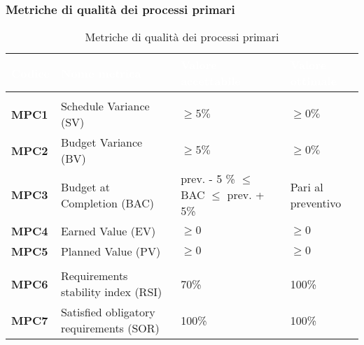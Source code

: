 \subsubsection{Metriche di qualità dei processi primari}
{
\renewcommand{\arraystretch}{1.5}
\centering
\begin{longtable}{C{2.5cm} C{4cm} C{6cm} C{2.5cm}}
\textcolor{white}{\textbf{Codice}}&
\textcolor{white}{\textbf{Nome metrica}}&
\textcolor{white}{\textbf{Valore accettabile}}&
\textcolor{white}{\textbf{Valore ottimale}}\\	
\hline
{}
 \\
\endhead

\endfoot
{}\caption{Metriche di qualità dei processi primari}
\endlastfoot

\textbf{MPC1} & Schedule Variance (SV) & $\geq 5\%$ & $\geq 0\%$ \\
\textbf{MPC2} & Budget Variance (BV) & $\geq 5\%$ & $\geq 0\%$ \\
\textbf{MPC3} & Budget at Completion (BAC) & prev. - 5 \% $ \leq $ BAC $ \leq $ prev. + 5\% & Pari al preventivo  \\
\textbf{MPC4} & Earned Value (EV) & $\geq 0$  & $\geq 0$ \\
\textbf{MPC5} & Planned Value (PV) & $\geq 0$  & $\geq 0$ \\
 \\
\textbf{MPC6} & Requirements stability index (RSI) & 70\% & 100\% \\
\textbf{MPC7} & Satisfied obligatory requirements (SOR) & 100\% & 100\%
\end{longtable}
}



